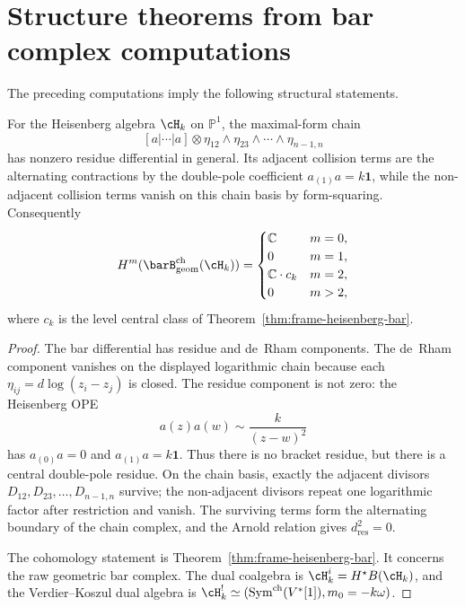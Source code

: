 \section{Structure theorems from bar complex computations}
\label{sec:bar-structure-theorems}

The preceding computations imply the following structural statements.

\begin{proposition}
\label{prop:heisenberg-maximal-form-cycles}
For the Heisenberg algebra $\cH_k$ on $\mathbb P^1$, the
maximal-form chain
\[
[a|\cdots|a]\otimes
\eta_{12}\wedge\eta_{23}\wedge\cdots\wedge\eta_{n-1,n}
\]
has nonzero residue differential in general. Its adjacent collision
terms are the alternating contractions by the double-pole coefficient
$a_{(1)}a=k\mathbf 1$, while the non-adjacent collision terms vanish
on this chain basis by form-squaring. Consequently
\[
H^m(\barB^{\mathrm{ch}}_{\mathrm{geom}}(\cH_k))
=
\begin{cases}
\mathbb C & m=0,\\
0 & m=1,\\
\mathbb C\cdot c_k & m=2,\\
0 & m>2,
\end{cases}
\]
where $c_k$ is the level central class of
Theorem~\ref{thm:frame-heisenberg-bar}.
\end{proposition}

\begin{proof}
The bar differential has residue and de~Rham components. The de~Rham
component vanishes on the displayed logarithmic chain because each
$\eta_{ij}=d\log(z_i-z_j)$ is closed. The residue component is not
zero: the Heisenberg OPE
\[
a(z)a(w)\sim \frac{k}{(z-w)^2}
\]
has $a_{(0)}a=0$ and $a_{(1)}a=k\mathbf 1$. Thus there is no bracket
residue, but there is a central double-pole residue. On the chain
basis, exactly the adjacent divisors $D_{12},D_{23},\ldots,D_{n-1,n}$
survive; the non-adjacent divisors repeat one logarithmic factor after
restriction and vanish. The surviving terms form the alternating
boundary of the chain complex, and the Arnold relation gives
$d_{\mathrm{res}}^2=0$.

The cohomology statement is Theorem~\ref{thm:frame-heisenberg-bar}.
It concerns the raw geometric bar complex. The dual coalgebra is
$\cH_k^i=H^\star B(\cH_k)$, and the Verdier--Koszul dual algebra is
$\cH_k^!\simeq(\mathrm{Sym}^{\mathrm{ch}}(V^*[1]),m_0=-k\omega)$.
\end{proof}

